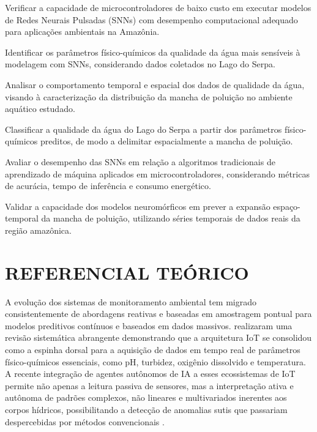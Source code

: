 \documentclass[twoside]{article}
\begin{document}
\begin{compactitem}
  \item Verificar a capacidade de microcontroladores de baixo custo em executar 
  modelos de Redes Neurais Pulsadas (SNNs) com desempenho computacional adequado 
  para aplicações ambientais na Amazônia.

  \item Identificar os parâmetros físico-químicos da qualidade da água mais sensíveis 
  à modelagem com SNNs, considerando dados coletados no Lago do Serpa.

  \item Analisar o comportamento temporal e espacial dos dados de qualidade da água, 
  visando à caracterização da distribuição da mancha de poluição no ambiente 
  aquático estudado.

  \item Classificar a qualidade da água do Lago do Serpa a partir dos parâmetros 
  físico-químicos preditos, de modo a delimitar espacialmente a mancha de poluição.

  \item Avaliar o desempenho das SNNs em relação a algoritmos tradicionais de 
  aprendizado de máquina aplicados em microcontroladores, considerando métricas 
  de acurácia, tempo de inferência e consumo energético.

  \item Validar a capacidade dos modelos neuromórficos em prever a expansão 
  espaço-temporal da mancha de poluição, utilizando séries temporais de dados 
  reais da região amazônica.
\end{compactitem}



\FloatBarrier
\section{REFERENCIAL TEÓRICO}

A evolução dos sistemas de monitoramento ambiental tem migrado
consistentemente de abordagens reativas e baseadas em amostragem
pontual para modelos preditivos contínuos e baseados em dados massivos.
 realizaram uma revisão sistemática abrangente
demonstrando que a arquitetura IoT se consolidou como a espinha dorsal
para a aquisição de dados em tempo real de parâmetros físico-químicos
essenciais, como pH, turbidez, oxigênio dissolvido e temperatura.
A recente integração de agentes autônomos de IA a esses ecossistemas
de IoT permite não apenas a leitura passiva de sensores, mas a
interpretação ativa e autônoma de padrões complexos, não lineares e
multivariados inerentes aos corpos hídricos, possibilitando a detecção
de anomalias sutis que passariam despercebidas por métodos convencionais
\cite{miller2025}.
\end{document}
